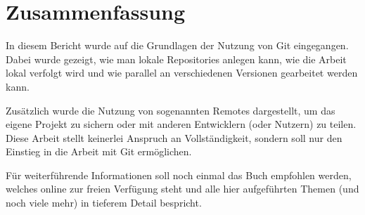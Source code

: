 \section{Zusammenfassung}
In diesem Bericht wurde auf die Grundlagen der Nutzung von Git eingegangen. Dabei wurde gezeigt, wie man lokale Repositories anlegen kann, wie die Arbeit lokal verfolgt wird und wie parallel an verschiedenen Versionen gearbeitet werden kann.

Zusätzlich wurde die Nutzung von sogenannten Remotes dargestellt, um das eigene Projekt zu sichern oder mit anderen Entwicklern (oder Nutzern) zu teilen. Diese Arbeit stellt keinerlei Anspruch an Vollständigkeit, sondern soll nur den Einstieg in die Arbeit mit Git ermöglichen.

Für weiterführende Informationen soll noch einmal das Buch \cite{ProGit} empfohlen werden, welches online zur freien Verfügung steht und alle hier aufgeführten Themen (und noch viele mehr) in tieferem Detail bespricht.